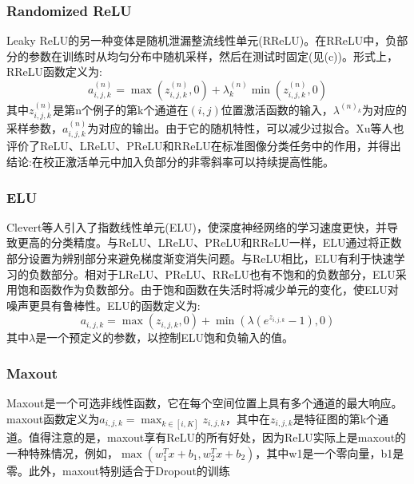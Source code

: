 \documentclass[final]{cvpr}
\begin{document}
\subsubsection{Randomized ReLU}
Leaky ReLU的另一种变体是随机泄漏整流线性单元(RReLU)。在RReLU中，负部分的参数在训练时从均匀分布中随机采样，然后在测试时固定(见(c))。形式上，RReLU函数定义为:
\begin{equation}
	a^{(n)}_{i,j,k}=\max(z^{(n)}_{i,j,k},0)+\lambda^{(n)}_k\min(z^{(n)}_{i,j,k},0)
\end{equation}
其中$z^{(n)}_{i,j,k}$是第n个例子的第k个通道在$(i, j)$位置激活函数的输入，$\lambda^{(n)_k}$为对应的采样参数，$a^{(n)}_{i,j,k}$为对应的输出。由于它的随机特性，可以减少过拟合。Xu等人也评价了ReLU、LReLU、PReLU和RReLU在标准图像分类任务中的作用，并得出结论:在校正激活单元中加入负部分的非零斜率可以持续提高性能。
\subsubsection{ELU}
Clevert等人引入了指数线性单元(ELU)，使深度神经网络的学习速度更快，并导致更高的分类精度。与ReLU、LReLU、PReLU和RReLU一样，ELU通过将正数部分设置为辨别部分来避免梯度渐变消失问题。与ReLU相比，ELU有利于快速学习的负数部分。相对于LReLU、PReLU、RReLU也有不饱和的负数部分，ELU采用饱和函数作为负数部分。由于饱和函数在失活时将减少单元的变化，使ELU对噪声更具有鲁棒性。ELU的函数定义为:
\begin{equation}
	a_{i,j,k}=\max(z_{i,j,k},0)+\min(\lambda(e^{z_{i,j,k}}-1),0)
\end{equation}
其中$\lambda$是一个预定义的参数，以控制ELU饱和负输入的值。

\subsubsection{Maxout}
Maxout是一个可选非线性函数，它在每个空间位置上具有多个通道的最大响应。maxout函数定义为$a_{i,j,k}=\max_{k\in[i,K]}z_{i,j,k}$，其中在$z_{i,j,k}$是特征图的第k个通道。值得注意的是，maxout享有ReLU的所有好处，因为ReLU实际上是maxout的一种特殊情况，例如，$\max(w^T_1x+b_1,w^T_2x+b_2)$，其中w1是一个零向量，b1是零。此外，maxout特别适合于Dropout的训练
\end{document}
